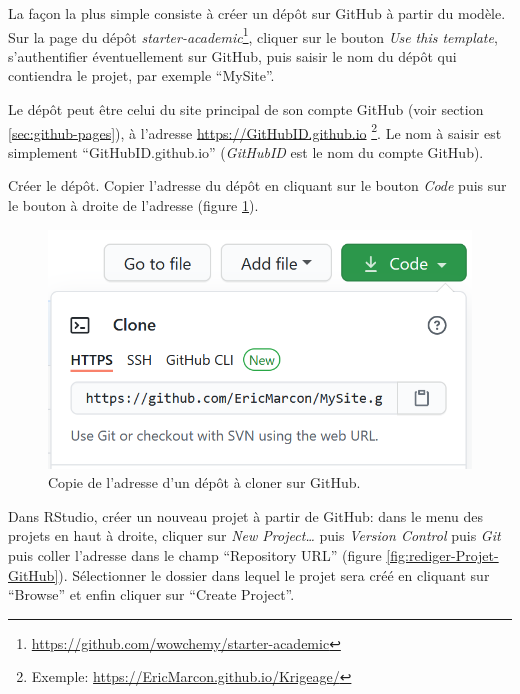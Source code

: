 \documentclass[
  12pt,
  french,
  a4paper,
  extrafontsizes,onecolumn,openright
  ]{memoir}
\begin{document}
La façon la plus simple consiste à créer un dépôt sur GitHub à partir du modèle.
Sur la page du dépôt \emph{starter-academic}\footnote{\url{https://github.com/wowchemy/starter-academic}}, cliquer sur le bouton \emph{Use this template}, s'authentifier éventuellement sur GitHub, puis saisir le nom du dépôt qui contiendra le projet, par exemple \enquote{MySite}.

Le dépôt peut être celui du site principal de son compte GitHub (voir section \ref{sec:github-pages}), à l'adresse \url{https://GitHubID.github.io} \footnote{Exemple: \url{https://EricMarcon.github.io/Krigeage/}}.
Le nom à saisir est simplement \enquote{GitHubID.github.io} (\emph{GitHubID} est le nom du compte GitHub).

Créer le dépôt.
Copier l'adresse du dépôt en cliquant sur le bouton \emph{Code} puis sur le bouton à droite de l'adresse (figure \ref{fig:rediger-GitHub-Clone}).



\scriptsize

\begin{figure}

{\centering \includegraphics[width=0.8\linewidth]{images/rediger-GitHub-Clone} 

}

\caption{Copie de l'adresse d'un dépôt à cloner sur GitHub.}\label{fig:rediger-GitHub-Clone}
\end{figure}

\normalsize

Dans RStudio, créer un nouveau projet à partir de GitHub: dans le menu des projets en haut à droite, cliquer sur \emph{New Project\ldots{}} puis \emph{Version Control} puis \emph{Git} puis coller l'adresse dans le champ \enquote{Repository URL} (figure \ref{fig:rediger-Projet-GitHub}).
Sélectionner le dossier dans lequel le projet sera créé en cliquant sur \enquote{Browse} et enfin cliquer sur \enquote{Create Project}.
\end{document}
